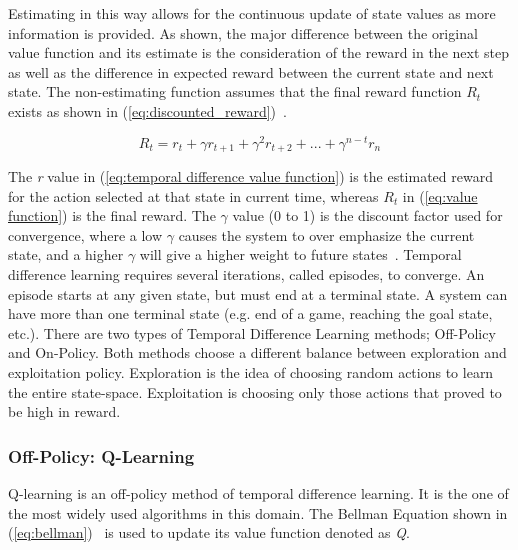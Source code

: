 \documentclass[12pt,american]{report}
\begin{document}
        Estimating in this way allows for the continuous update of state values as more information is provided. As shown, the major difference between the original value function and its estimate is the consideration of the reward in the next step as well as the difference in expected reward between the current state and next state. The non-estimating function assumes that the final reward function \textit{$R_{t}$} exists as shown in (\ref{eq:discounted_reward})~\cite{matiisen_2015}.

        \begin{equation}
            \label{eq:discounted_reward}
            R_{t} = r_t + \gamma r_{t+1} + \gamma^2 r_{t+2} + ... + \gamma^{n-t}r_n 
        \end{equation}

        The \textit{r} value in (\ref{eq:temporal difference value function}) is the estimated reward for the action selected at that state in current time, whereas \textit{$R_t$} in (\ref{eq:value function}) is the final reward.  The \begin{math}\gamma\end{math} value (0 to 1) is the discount factor used for convergence, where a low \begin{math}\gamma\end{math} causes the system to over emphasize the current state, and a higher \begin{math}\gamma\end{math} will give a higher weight to future states~\cite{Eden}. Temporal difference learning requires several iterations, called episodes, to converge. An episode starts at any given state, but must end at a terminal state.  A system can have more than one terminal state (e.g. end of a game, reaching the goal state, etc.). There are two types of Temporal Difference Learning methods; Off-Policy and On-Policy.  Both methods choose a different balance between exploration and exploitation policy.  Exploration is the idea of choosing random actions to learn the entire state-space.  Exploitation is choosing only those actions that proved to be high in reward.

        
        \subsubsection{Off-Policy: Q-Learning}
        Q-learning is an off-policy method of temporal difference learning. It is the one of the most widely used algorithms in this domain. The Bellman Equation shown in (\ref{eq:bellman})~\cite{matiisen_2015} is used to update its value function denoted as \textit{Q}.
\end{document}
